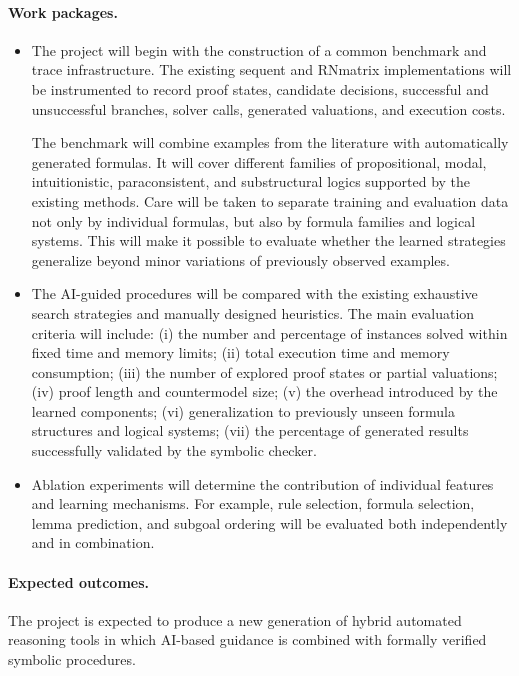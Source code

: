\documentclass[a4paper]{article}
\begin{document}
\paragraph{Work packages.}
\begin{itemize}
\item[\bf WP~1] The project will begin with the construction of a common benchmark and trace infrastructure. The existing sequent and RNmatrix implementations will be instrumented to record proof states, candidate decisions, successful and unsuccessful branches, solver calls, generated valuations, and execution costs.

The benchmark will combine examples from the literature with automatically generated formulas. It will cover different families of propositional, modal, intuitionistic, paraconsistent, and substructural logics supported by the existing methods. Care will be taken to separate training and evaluation data not only by individual formulas, but also by formula families and logical systems. This will make it possible to evaluate whether the learned strategies generalize beyond minor variations of previously observed examples.

\item[\bf WP~2]  The AI-guided procedures will be compared with the existing exhaustive search strategies and manually designed heuristics. The main evaluation criteria will include: (i) the number and percentage of instances solved within fixed time and memory limits; (ii) total execution time and memory consumption; (iii) the number of explored proof states or partial valuations; (iv) proof length and countermodel size; (v) the overhead introduced by the learned components; (vi) generalization to previously unseen formula structures and logical systems; (vii) the percentage of generated results successfully validated by the symbolic checker.

\item[\bf WP~3]  Ablation experiments will determine the contribution of individual features and learning mechanisms. For example, rule selection, formula selection, lemma prediction, and subgoal ordering will be evaluated both independently and in combination.
\end{itemize}
\paragraph{Expected outcomes.}
The project is expected to produce a new generation of hybrid automated reasoning tools in which AI-based guidance is combined with formally verified symbolic procedures.
\end{document}
